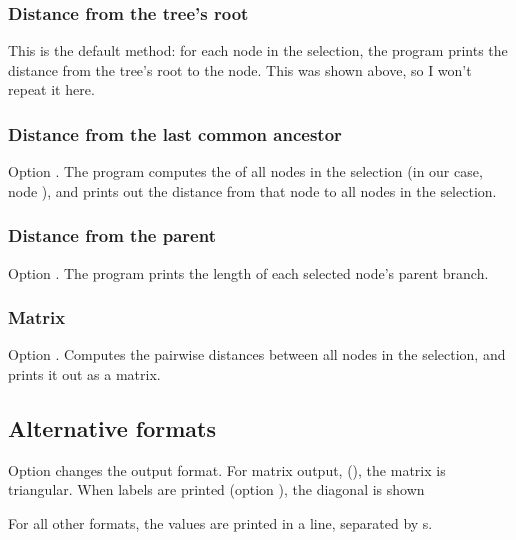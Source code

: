 \subsubsection{Distance from the tree's root}

This is the default method: for each node in the selection, the program prints
the distance from the tree's root to the node. This was shown above, so I
won't repeat it here.

\subsubsection{Distance from the last common ancestor}
Option . The program computes the \lca{} of all nodes in the
selection (in our case, node ), and prints out the distance from
that node to all nodes in the selection.

\subsubsection{Distance from the parent}
Option . The program prints the length of each selected node's
parent branch.

\subsubsection{Matrix}
Option . Computes the pairwise distances between all nodes in the
selection, and prints it out as a matrix.

\subsection{Alternative formats}

Option  changes the output format. For matrix output, (), the matrix is triangular. 
When labels are printed (option ), the diagonal is shown

For all other formats, the values are printed in a line, separated by
s.
